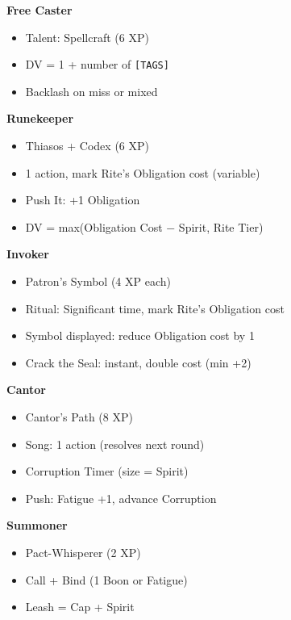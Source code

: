 \begin{tcolorbox}[colback=black!3!white,colframe=black!40!white,title=Magic Quick Reference,fonttitle=\bfseries,breakable]
\textbf{Free Caster}
\begin{itemize}
  \item Talent: Spellcraft (6 XP)
  \item DV = 1 + number of \texttt{[TAGS]}
  \item Backlash on miss or mixed
\end{itemize}

\textbf{Runekeeper}
\begin{itemize}
  \item Thiasos + Codex (6 XP)
  \item 1 action, mark Rite's Obligation cost (variable)
  \item Push It: +1 Obligation
  \item DV = max(Obligation Cost − Spirit, Rite Tier)
\end{itemize}

\textbf{Invoker}
\begin{itemize}
  \item Patron's Symbol (4 XP each)
  \item Ritual: Significant time, mark Rite's Obligation cost
  \item Symbol displayed: reduce Obligation cost by 1
  \item Crack the Seal: instant, double cost (min +2)
\end{itemize}

\textbf{Cantor}
\begin{itemize}
  \item Cantor's Path (8 XP)
  \item Song: 1 action (resolves next round)
  \item Corruption Timer (size = Spirit)
  \item Push: Fatigue +1, advance Corruption
\end{itemize}

\textbf{Summoner}
\begin{itemize}
  \item Pact-Whisperer (2 XP)
  \item Call + Bind (1 Boon or Fatigue)
  \item Leash = Cap + Spirit
\end{itemize}
\end{tcolorbox}